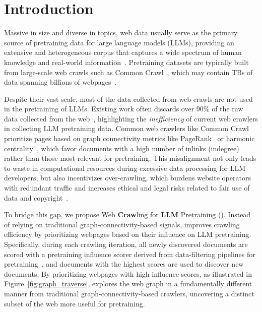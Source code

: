 \section{Introduction}


Massive in size and diverse in topics, web data usually serve as the primary source of pretraining data for large language models (LLMs), providing an extensive and heterogeneous corpus that captures a wide spectrum of human knowledge and real-world information~\citep{cc-analysis, dubey2024llama, fineweb}.
Pretraining datasets are typically built from large-scale web crawls such as Common Crawl~\citep{CommonCrawl2007}, which may contain TBs of data spanning billions of webpages~\citep{fineweb,redpajamav2}.




Despite their vast scale, most of the data collected from web crawls are not used in the pretraining of LLMs.
Existing work often discards over 90\% of the raw data collected from the web~\citep{dclm,fineweb,txt360}, highlighting the \textit{inefficiency} of current web crawlers in collecting LLM pretraining data.
Common web crawlers like Common Crawl prioritize pages based on graph connectivity metrics like PageRank~\citep{pagerank,pr-crawl} or harmonic centrality~\citep{harmonic,cc-analysis}, which favor documents with a high number of inlinks (indegree)~\citep{pr-and-indegree} rather than those most relevant for pretraining.
This misalignment not only leads to waste in computational resources during excessive data processing for LLM developers, but also incentivizes over-crawling, which burdens website operators with redundant traffic and increases ethical and legal risks related to fair use of data and copyright~\citep{longpre2024consent,nyt_vs_openai}.

To bridge this gap, we propose Web \textbf{Craw}ling for \textbf{LL}\textbf{M} Pretraining (\ours{}).
Instead of relying on traditional graph-connectivity-based signals, \ours{} improves crawling efficiency by prioritizing webpages based on their influence on LLM pretraining.
Specifically, during each crawling iteration, all newly discovered documents are scored with a pretraining influence scorer derived from data-filtering pipelines for pretraining~\citep{dclm,fineweb}, and documents with the highest scores are used to discover new documents.
By prioritizing webpages with high influence scores, as illustrated in Figure~\ref{fig:graph_traverse}, \ours{} explores the web graph in a fundamentally different manner from traditional graph-connectivity-based crawlers, uncovering a distinct subset of the web more useful for pretraining.

